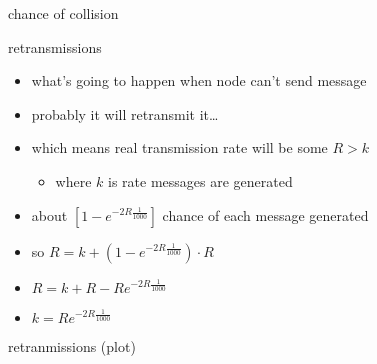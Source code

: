 \begin{frame}{chance of collision}
\end{frame}

\begin{frame}{retransmissions}
    \begin{itemize}
    \item what's going to happen when node can't send message
    \item probably it will retransmit it\ldots
    \vspace{.5cm}
    \item which means real transmission rate will be some $R > k$
        \begin{itemize}
        \item where $k$ is rate messages are generated
        \end{itemize}
    \item about $[1-e^{-2R\frac{1}{1000}}]$ chance of each message generated
    \item so $R = k + \left(1-e^{-2R\frac{1}{1000}}\right) \cdot R$
    \item $R = k + R - Re^{-2R\frac{1}{1000}}$
    \item $k = Re^{-2R\frac{1}{1000}}$
    \end{itemize}
\end{frame}

\begin{frame}{retranmissions (plot)}
\end{frame}

